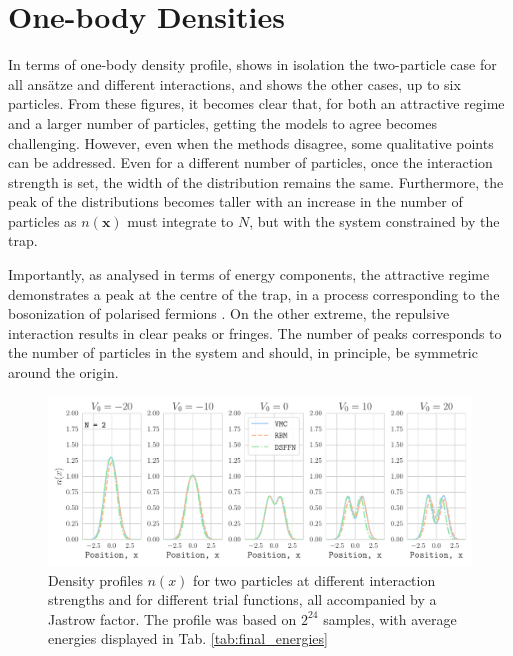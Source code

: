 \section{One-body Densities}

In terms of one-body density profile,  shows in isolation the two-particle case for all ansätze and different interactions, and  shows the other cases, up to six particles. From these figures, it becomes clear that, for both an attractive regime and a larger number of particles, getting the models to agree becomes challenging. However, even when the methods disagree, some qualitative points can be addressed. Even for a different number of particles, once the interaction strength is set, the width of the distribution remains the same. Furthermore, the peak of the distributions becomes taller with an increase in the number of particles as $n(\mathbf{x})$ must integrate to $N$, but with the system constrained by the trap.

Importantly, as analysed in terms of energy components, the attractive regime demonstrates a peak at the centre of the trap, in a process corresponding to the bosonization of polarised fermions \cite{valiente2020bose}. On the other extreme, the repulsive interaction results in clear peaks or fringes. The number of peaks corresponds to the number of particles in the system and should, in principle, be symmetric around the origin. 

\begin{figure}[H]
    \centering
    \includegraphics[width=1\linewidth]{Chapters/Results/N2/density_profile_N[2]_nqs_DSFFN.pdf}
    \caption{Density profiles $n(x)$ for two particles at different interaction strengths and for different trial functions, all accompanied by a Jastrow factor. The profile was based on $2^{24}$ samples, with average energies displayed in Tab. \ref{tab:final_energies}}
    \label{fig:density_n2}
\end{figure}

